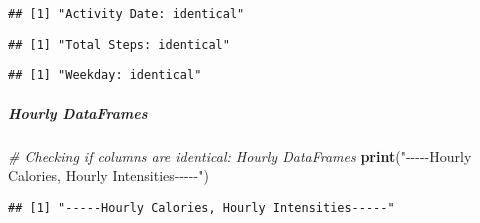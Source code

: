 \documentclass[
]{article}
\newenvironment{Shaded}{\begin{snugshade}}{\end{snugshade}}
\newcommand{\CommentTok}[1]{\textcolor[rgb]{0.56,0.35,0.01}{\textit{#1}}}
\newcommand{\ControlFlowTok}[1]{\textcolor[rgb]{0.13,0.29,0.53}{\textbf{#1}}}
\newcommand{\DecValTok}[1]{\textcolor[rgb]{0.00,0.00,0.81}{#1}}
\newcommand{\FunctionTok}[1]{\textcolor[rgb]{0.13,0.29,0.53}{\textbf{#1}}}
\newcommand{\NormalTok}[1]{#1}
\newcommand{\SpecialCharTok}[1]{\textcolor[rgb]{0.81,0.36,0.00}{\textbf{#1}}}
\newcommand{\StringTok}[1]{\textcolor[rgb]{0.31,0.60,0.02}{#1}}
\begin{document}
\begin{verbatim}
## [1] "Activity Date: identical"
\end{verbatim}

\begin{Shaded}
\end{Shaded}

\begin{verbatim}
## [1] "Total Steps: identical"
\end{verbatim}

\begin{Shaded}
\end{Shaded}

\begin{verbatim}
## [1] "Weekday: identical"
\end{verbatim}

\hypertarget{hourly-dataframes-6}{%
\subparagraph{Hourly DataFrames}\label{hourly-dataframes-6}}

\begin{Shaded}
\begin{Highlighting}[]
\CommentTok{\# Checking if columns are identical: Hourly DataFrames}
\FunctionTok{print}\NormalTok{(}\StringTok{"{-}{-}{-}{-}{-}Hourly Calories, Hourly Intensities{-}{-}{-}{-}{-}"}\NormalTok{)}
\end{Highlighting}
\end{Shaded}

\begin{verbatim}
## [1] "-----Hourly Calories, Hourly Intensities-----"
\end{verbatim}

\begin{Shaded}
\end{Shaded}
\end{document}
